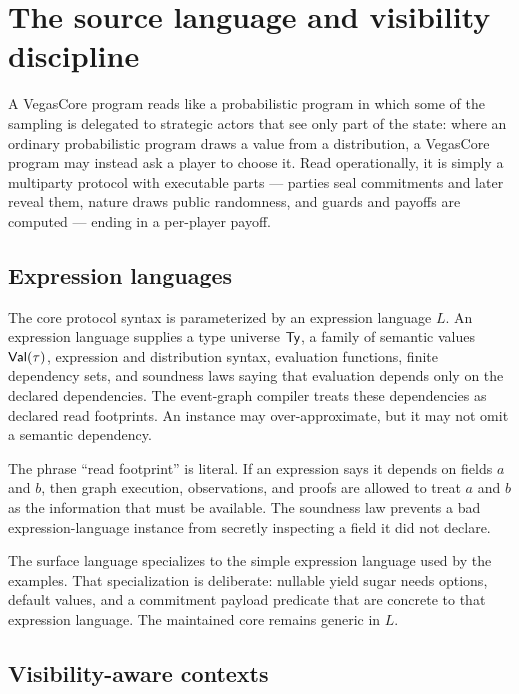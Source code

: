 \section{The source language and visibility discipline}
\label{sec:source-language}

A VegasCore program reads like a probabilistic program in which some of
the sampling is delegated to strategic actors that see only part of the
state: where an ordinary probabilistic program draws a value from a
distribution, a VegasCore program may instead ask a player to choose it.
Read operationally, it is simply a multiparty protocol with executable
parts --- parties seal commitments and later reveal them, nature draws
public randomness, and guards and payoffs are computed --- ending in a
per-player payoff.

\subsection{Expression languages}

The core protocol syntax is parameterized by an expression language
\(L\).  An expression language supplies a type universe \(\mathsf{Ty}\), a
family of semantic values \(\mathsf{Val}(\tau)\), expression and distribution
syntax, evaluation functions, finite dependency sets, and soundness
laws saying that evaluation depends only on the declared dependencies.
The event-graph compiler treats these dependencies as declared read
footprints.  An instance may over-approximate, but it may not omit a
semantic dependency.

The phrase ``read footprint'' is literal.  If an expression says it
depends on fields \(a\) and \(b\), then graph execution, observations,
and proofs are allowed to treat \(a\) and \(b\) as the information that
must be available.  The soundness law prevents a bad expression-language
instance from secretly inspecting a field it did not declare.

The surface language specializes to the simple expression
language used by the examples.  That specialization is deliberate:
nullable yield sugar needs options, default values, and a commitment
payload predicate that are concrete to that expression language.  The
maintained core remains generic in \(L\).

\subsection{Visibility-aware contexts}

